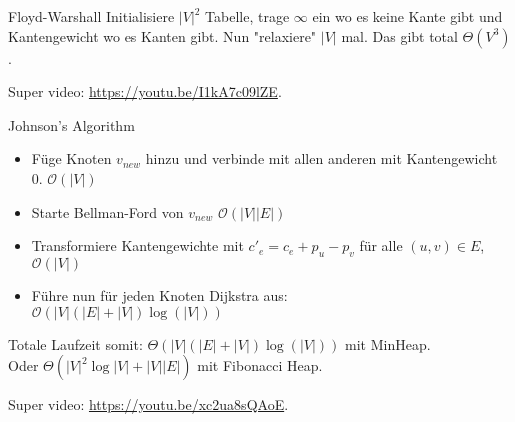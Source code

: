 \documentclass[avery5371,grid]{flashcards}
\begin{document}
\begin{flashcard}[A\&D]{Floyd-Warshall}
Initialisiere $|V|^2$ Tabelle, trage $\infty$ ein wo es keine Kante gibt und Kantengewicht wo es Kanten gibt. Nun "relaxiere" $|V|$ mal. Das gibt total $\Theta(V^3)$. 
\par Super video: \href{https://youtu.be/I1kA7c09lZE}{https://youtu.be/I1kA7c09lZE}.
\end{flashcard}

\begin{flashcard}[A\&D]{Johnson's Algorithm}
    \begin{itemize}
        \item Füge Knoten $v_{new}$ hinzu und verbinde mit allen anderen mit Kantengewicht 0. $\mathcal{O}(|V|)$
        \item Starte Bellman-Ford von $v_{new}$ $\mathcal{O}(|V||E|)$
        \item Transformiere Kantengewichte mit ${c'}_e = c_e + p_u - p_v $ für alle $(u,v)\in E$,  $\mathcal{O}(|V|)$
        \item Führe nun für jeden Knoten Dijkstra aus: \\$\mathcal{O}(|V|(|E| + |V|)\log(|V|))$
    \end{itemize}
    Totale Laufzeit somit: ${\Theta}(|V|(|E| + |V|)\log(|V|))$ mit MinHeap.\\
    Oder ${\Theta(|V|^{2}\log |V|+|V||E|)}$ mit Fibonacci Heap.
\par Super video: \href{https://youtu.be/xc2ua8sQAoE}{https://youtu.be/xc2ua8sQAoE}.
\end{flashcard}
\end{document}
